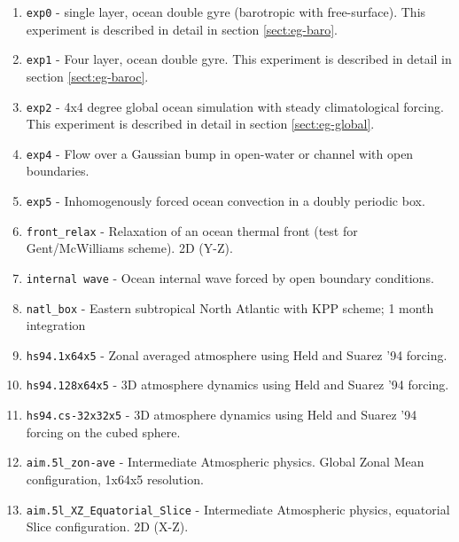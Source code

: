 \begin{enumerate}
  
\item \texttt{exp0} - single layer, ocean double gyre (barotropic with
  free-surface). This experiment is described in detail in section
  \ref{sect:eg-baro}.

\item \texttt{exp1} - Four layer, ocean double gyre. This experiment
  is described in detail in section \ref{sect:eg-baroc}.
  
\item \texttt{exp2} - 4x4 degree global ocean simulation with steady
  climatological forcing. This experiment is described in detail in
  section \ref{sect:eg-global}.
  
\item \texttt{exp4} - Flow over a Gaussian bump in open-water or
  channel with open boundaries.
  
\item \texttt{exp5} - Inhomogenously forced ocean convection in a
  doubly periodic box.

\item \texttt{front\_relax} - Relaxation of an ocean thermal front (test for
Gent/McWilliams scheme). 2D (Y-Z).

\item \texttt{internal wave} - Ocean internal wave forced by open
  boundary conditions.
  
\item \texttt{natl\_box} - Eastern subtropical North Atlantic with KPP
  scheme; 1 month integration
  
\item \texttt{hs94.1x64x5} - Zonal averaged atmosphere using Held and
  Suarez '94 forcing.
  
\item \texttt{hs94.128x64x5} - 3D atmosphere dynamics using Held and
  Suarez '94 forcing.
  
\item \texttt{hs94.cs-32x32x5} - 3D atmosphere dynamics using Held and
  Suarez '94 forcing on the cubed sphere.
  
\item \texttt{aim.5l\_zon-ave} - Intermediate Atmospheric physics.
  Global Zonal Mean configuration, 1x64x5 resolution.
  
\item \texttt{aim.5l\_XZ\_Equatorial\_Slice} - Intermediate
  Atmospheric physics, equatorial Slice configuration.  2D (X-Z).
  

\end{enumerate}
